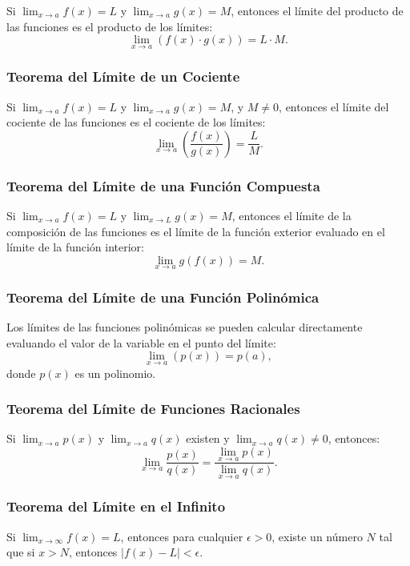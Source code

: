 Si \( \lim_{x \to a} f(x) = L \) y \( \lim_{x \to a} g(x) = M \), entonces el límite del producto de las funciones es el producto de los límites:
\[
\lim_{x \to a} \left( f(x) \cdot g(x) \right) = L \cdot M.
\]

\subsubsection{Teorema del Límite de un Cociente}

Si \( \lim_{x \to a} f(x) = L \) y \( \lim_{x \to a} g(x) = M \), y \( M \neq 0 \), entonces el límite del cociente de las funciones es el cociente de los límites:
\[
\lim_{x \to a} \left( \frac{f(x)}{g(x)} \right) = \frac{L}{M}.
\]

\subsubsection{Teorema del Límite de una Función Compuesta}

Si \( \lim_{x \to a} f(x) = L \) y \( \lim_{x \to L} g(x) = M \), entonces el límite de la composición de las funciones es el límite de la función exterior evaluado en el límite de la función interior:
\[
\lim_{x \to a} g(f(x)) = M.
\]

\subsubsection{Teorema del Límite de una Función Polinómica}

Los límites de las funciones polinómicas se pueden calcular directamente evaluando el valor de la variable en el punto del límite:
\[
\lim_{x \to a} (p(x)) = p(a),
\]
donde \( p(x) \) es un polinomio.

\subsubsection{Teorema del Límite de Funciones Racionales}

Si \( \lim_{x \to a} p(x) \) y \( \lim_{x \to a} q(x) \) existen y \( \lim_{x \to a} q(x) \neq 0 \), entonces:
\[
\lim_{x \to a} \frac{p(x)}{q(x)} = \frac{\lim_{x \to a} p(x)}{\lim_{x \to a} q(x)}.
\]

\subsubsection{Teorema del Límite en el Infinito}

Si \( \lim_{x \to \infty} f(x) = L \), entonces para cualquier \( \epsilon > 0 \), existe un número \( N \) tal que si \( x > N \), entonces \( |f(x) - L| < \epsilon \).

